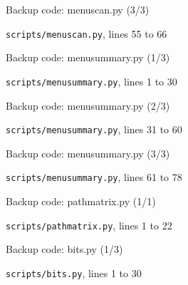 \begin{frame}{Backup code: menuscan.py (3/3)}
  \vspace{0pt}\par
  {\tiny\color{lightgrey}\texttt{scripts/menuscan.py}, lines 55 to 66\par}
  
\end{frame}
\begin{frame}{Backup code: menusummary.py (1/3)}
  \vspace{0pt}\par
  {\tiny\color{lightgrey}\texttt{scripts/menusummary.py}, lines 1 to 30\par}
  
\end{frame}
\begin{frame}{Backup code: menusummary.py (2/3)}
  \vspace{0pt}\par
  {\tiny\color{lightgrey}\texttt{scripts/menusummary.py}, lines 31 to 60\par}
  
\end{frame}
\begin{frame}{Backup code: menusummary.py (3/3)}
  \vspace{0pt}\par
  {\tiny\color{lightgrey}\texttt{scripts/menusummary.py}, lines 61 to 78\par}
  
\end{frame}
\begin{frame}{Backup code: pathmatrix.py (1/1)}
  \vspace{0pt}\par
  {\tiny\color{lightgrey}\texttt{scripts/pathmatrix.py}, lines 1 to 22\par}
  
\end{frame}
\begin{frame}{Backup code: bits.py (1/3)}
  \vspace{0pt}\par
  {\tiny\color{lightgrey}\texttt{scripts/bits.py}, lines 1 to 30\par}
  
\end{frame}
